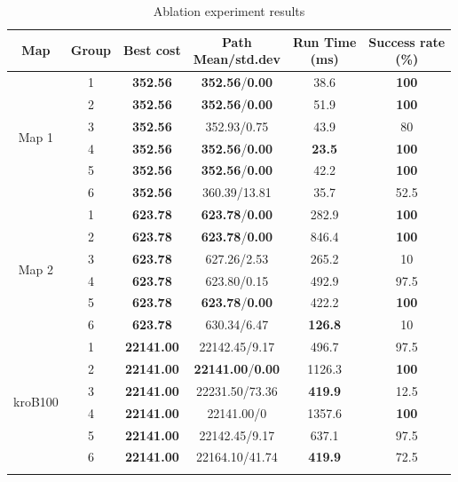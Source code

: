 \documentclass[pdflatex,sn-basic,Numbered]{sn-jnl}
\begin{document}
\begin{table}[!t]
\caption{Ablation experiment results}
\label{tab:ablation}
\centering
\footnotesize
\setlength{\tabcolsep}{2.5pt}
\begin{tabular}{cccccc}
\toprule
Map & Group & Best cost & \makecell{Path\\Mean/std.dev} & \makecell{Run Time\\(ms)} & \makecell{Success rate\\(\%)} \\
\midrule
 \multirow{6}{*}{Map 1} & 1 & \textbf{352.56} & \textbf{352.56}/\textbf{0.00} & 38.6 & \textbf{100} \\
   & 2 & \textbf{352.56} & \textbf{352.56}/\textbf{0.00} & 51.9 & \textbf{100} \\
   & 3 & \textbf{352.56} & 352.93/0.75 & 43.9 & 80 \\
   & 4 & \textbf{352.56} & \textbf{352.56}/\textbf{0.00} & \textbf{23.5} & \textbf{100} \\
   & 5 & \textbf{352.56} & \textbf{352.56}/\textbf{0.00} & 42.2 & \textbf{100} \\
   & 6 & \textbf{352.56} & 360.39/13.81 & 35.7 & 52.5 \\
\midrule
 \multirow{6}{*}{Map 2} & 1 & \textbf{623.78} & \textbf{623.78}/\textbf{0.00} & 282.9 & \textbf{100} \\
   & 2 & \textbf{623.78} & \textbf{623.78}/\textbf{0.00} & 846.4 & \textbf{100} \\
   & 3 & \textbf{623.78} & 627.26/2.53 & 265.2 & 10 \\
   & 4 & \textbf{623.78} & 623.80/0.15 & 492.9 & 97.5 \\
   & 5 & \textbf{623.78} & \textbf{623.78}/\textbf{0.00} & 422.2 & \textbf{100} \\
   & 6 & \textbf{623.78} & 630.34/6.47 & \textbf{126.8} & 10 \\
\midrule
 \multirow{6}{*}{kroB100} & 1 & \textbf{22141.00} & 22142.45/9.17 & 496.7 & 97.5 \\
   & 2 & \textbf{22141.00} & \textbf{22141.00}/\textbf{0.00} & 1126.3 & \textbf{100} \\
   & 3 & \textbf{22141.00} & 22231.50/73.36 & \textbf{419.9} & 12.5 \\
   & 4 & \textbf{22141.00} & 22141.00/0 & 1357.6 & \textbf{100} \\
   & 5 & \textbf{22141.00} & 22142.45/9.17 & 637.1 & 97.5 \\
   & 6 & \textbf{22141.00} & 22164.10/41.74 & \textbf{419.9} & 72.5 \\
\botrule
\end{tabular}
\end{table}
\end{document}
